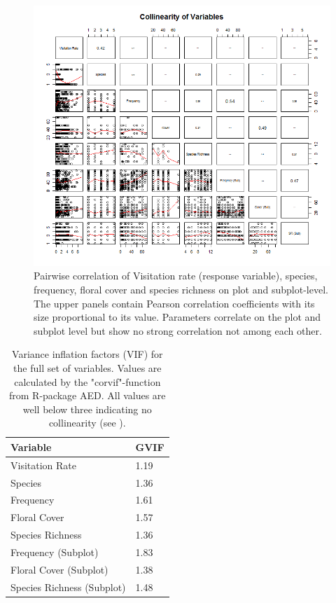 \newpage

\begin{figure} [H] %
\centering
\includegraphics[width=16cm]{Images/pairs-plot}
 \caption{Pairwise correlation of Visitation rate (response variable), species, frequency, floral cover and species richness on plot and subplot-level. The upper panels contain Pearson correlation coefficients with its size proportional to its value. Parameters correlate on the plot and subplot level but show no strong correlation not among each other.}
 \label{fig:pairs-plot}
\end{figure}


\begin{table}[!htbp] 
  \centering
  \caption{Variance inflation factors (VIF) for the full set of variables. Values are calculated by the "corvif"-function from R-package AED. All values are well below three indicating no collinearity (see \citet{zuur2007analysing}).}
    \begin{tabular}{ll}
    \toprule
    \textbf{Variable} & \textbf{GVIF}\\
    \midrule
    Visitation Rate  	 &  1.19\\
    Species 			 &  1.36\\
    Frequency 	  		 &  1.61\\
    Floral Cover   		 &  1.57\\
    Species Richness     &  1.36\\
    Frequency (Subplot) 	      &  1.83\\
    Floral Cover (Subplot)		  &  1.38\\
    Species Richness (Subplot)    &  1.48\\
    \bottomrule
    \end{tabular}%
\label{tab:VIF}
\end{table}%

